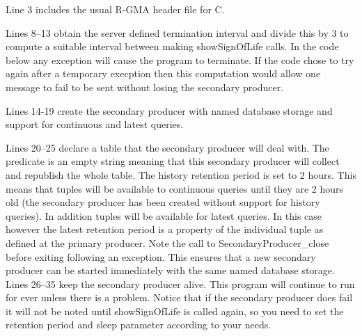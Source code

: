 Line 3 includes the usual R-GMA header file for C.

Lines 8--13 obtain the server defined termination interval and divide this by 3
to compute a suitable interval between making showSignOfLife calls. In the code
below any exception will cause the program to terminate. If the code chose to
try again after a temporary execption then this computation would allow one
message to fail to be sent without losing the secondary producer.

Lines 14-19 create the secondary producer with named database storage and
support for continuous and latest queries.

Lines 20--25 declare a table that the secondary producer will deal with. The
predicate is an empty string meaning that this secondary producer will collect
and republish the whole table. The history retention period is set to 2 hours.
This means that tuples will be available to continuous queries until they are 2
hours old (the secondary producer has been created without support for history
queries). In addition tuples will be available for latest queries. In this case
however the latest retention period is a property of the individual tuple as
defined at the primary producer. Note the call to SecondaryProducer\_close
before exiting following an exception. This ensures that a new
secondary producer can be started immediately with the same named database
storage.
Lines 26--35 keep the secondary producer alive.
This program will continue to run for ever unless there is a problem.
Notice that if the secondary producer does fail it will not be noted until
showSignOfLife is called again, so you need to set the retention period 
and sleep parameter according to your needs.


